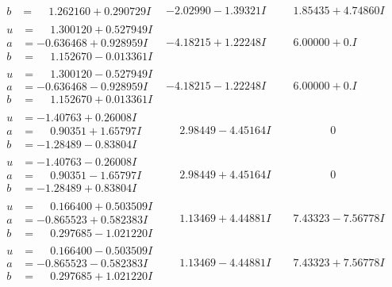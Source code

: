\documentclass[1p]{elsarticle_modified}
\theoremstyle{definition}
\begin{document}
$$\begin{array}{c|c|c}
\begin{aligned}
b &= \phantom{-}1.262160 + 0.290729 I\end{aligned}
 & -2.02990 - 1.39321 I & \phantom{-}1.85435 + 4.74860 I \\ \hline\begin{aligned}
u &= \phantom{-}1.300120 + 0.527949 I \\
a &= -0.636468 + 0.928959 I \\
b &= \phantom{-}1.152670 - 0.013361 I\end{aligned}
 & -4.18215 + 1.22248 I & \phantom{-}6.00000 + 0. I\phantom{ +0.000000I} \\ \hline\begin{aligned}
u &= \phantom{-}1.300120 - 0.527949 I \\
a &= -0.636468 - 0.928959 I \\
b &= \phantom{-}1.152670 + 0.013361 I\end{aligned}
 & -4.18215 - 1.22248 I & \phantom{-}6.00000 + 0. I\phantom{ +0.000000I} \\ \hline\begin{aligned}
u &= -1.40763 + 0.26008 I \\
a &= \phantom{-}0.90351 + 1.65797 I \\
b &= -1.28489 - 0.83804 I\end{aligned}
 & \phantom{-}2.98449 - 4.45164 I & \phantom{-0.000000 } 0 \\ \hline\begin{aligned}
u &= -1.40763 - 0.26008 I \\
a &= \phantom{-}0.90351 - 1.65797 I \\
b &= -1.28489 + 0.83804 I\end{aligned}
 & \phantom{-}2.98449 + 4.45164 I & \phantom{-0.000000 } 0 \\ \hline\begin{aligned}
u &= \phantom{-}0.166400 + 0.503509 I \\
a &= -0.865523 + 0.582383 I \\
b &= \phantom{-}0.297685 - 1.021220 I\end{aligned}
 & \phantom{-}1.13469 + 4.44881 I & \phantom{-}7.43323 - 7.56778 I \\ \hline\begin{aligned}
u &= \phantom{-}0.166400 - 0.503509 I \\
a &= -0.865523 - 0.582383 I \\
b &= \phantom{-}0.297685 + 1.021220 I\end{aligned}
 & \phantom{-}1.13469 - 4.44881 I & \phantom{-}7.43323 + 7.56778 I \\ \hline\begin{aligned}

\end{aligned}
\end{array}$$
\end{document}
